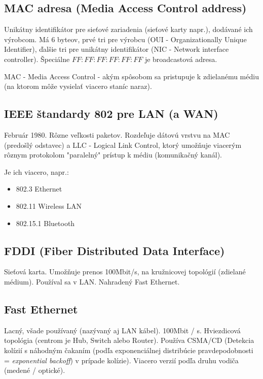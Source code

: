 \documentclass[10pt,a4paper]{article}
\begin{document}
\subsection{MAC adresa (Media Access Control address)}     
Unikátny identifikátor pre sieťové zariadenia (sieťové karty napr.),
dodávané ich výrobcom. Má 6 byteov, prvé tri pre výrobcu (OUI - Organizationally Unique Identifier), ďalšie tri pre unikátny identifikátor (NIC - Network interface controller). Špeciálne $FF:FF:FF:FF:FF:FF$ je broadcastová adresa. 
          
MAC -  Media Access Control - akým spôsobom sa pristupuje k zdielanému médiu (na ktorom môže vysielať viacero staníc naraz).          
\subsection{IEEE štandardy 802 pre LAN (a WAN)}  
Február 1980. Rôzne veľkosti paketov. Rozdeľuje dátovú vrstvu na MAC  (predošlý odstavec) a LLC - Logical Link Control, ktorý umožňuje viacerým rôznym protokolom "paralelný" prístup k médiu (komunikačný kanál).

Je ich viacero, napr.:
\begin{itemize}
\item 802.3 Ethernet      
\item 802.11 Wireless LAN
\item 802.15.1 Bluetooth 
\end{itemize}

\subsection{FDDI (Fiber Distributed Data Interface)}  
Sieťová karta. Umožňuje prenos 100Mbit/s, na kružnicovej topológií (zdielané médium). Používal sa v LAN. Nahradený Fast Ethernet.    
                 
\subsection{Fast Ethernet}            
Lacný, všade používaný (nazývaný aj LAN kábel).
100Mbit / s. Hviezdicová topológia (centrom je Hub, Switch alebo Router).
Používa CSMA/CD (Detekcia kolízií s náhodným čakaním (podľa exponenciálnej distribúcie pravdepodobnosti = \emph{exponential backoff}) v prípade kolízie). Viacero verzií podľa druhu vodiča (medené / optické).
\end{document}
